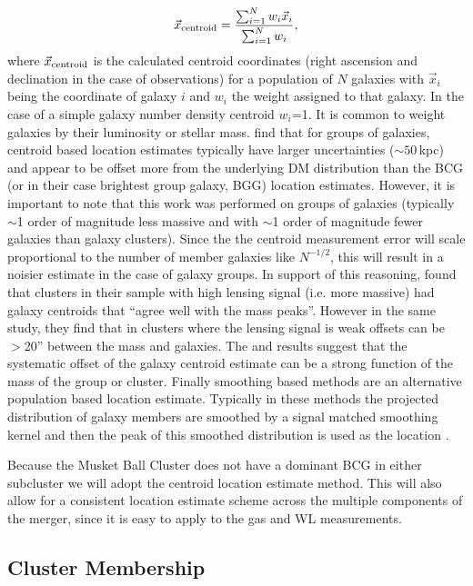 \begin{equation}
\vec{x}_{\rm centroid} = \frac{\sum_{i=1}^N w_i\vec{x}_i}{\sum_{i=1}^N w_i},
\label{equation:WeightedCentroid}
\end{equation}
where $\vec{x}_{\rm centroid}$ is the calculated centroid coordinates (right ascension and declination in the case of observations) for a population of $N$ galaxies with $\vec{x}_i$ being the coordinate of galaxy $i$ and $w_i$ the weight assigned to that galaxy.
In the case of a simple galaxy number density centroid $w_i$=1.
It is common to weight galaxies by their luminosity or stellar mass.
\citet{George:2012uo} find that for groups of galaxies, centroid based location estimates typically have larger uncertainties ($\sim50$\,kpc) and appear to be offset more from the underlying DM distribution than the BCG (or in their case brightest group galaxy, BGG) location estimates.
However, it is important to note that this work was performed on groups of galaxies (typically $\sim$1 order of magnitude less massive and with $\sim$1 order of magnitude fewer galaxies than galaxy clusters).
Since the the centroid measurement error will scale proportional to the number of member galaxies like $N^{-1/2}$, this will result in a noisier estimate in the case of galaxy groups.
In support of this reasoning, \citet{Jee:2011we} found that clusters in their sample with high lensing signal (i.e. more massive) had galaxy centroids that ``agree well with the mass peaks''.
However in the same study, they find that in clusters where the lensing signal is weak offsets can be $>$20'' between the mass and galaxies.
The \citet{George:2012uo} and \citet{Jee:2011we} results suggest that the systematic offset of the galaxy centroid estimate can be a strong function of the mass of the group or cluster.
Finally smoothing based methods are an alternative population based location estimate.
Typically in these methods the projected distribution of galaxy members are smoothed by a signal matched smoothing kernel and then the peak of this smoothed distribution is used as the location \citep[see e.g.][]{Merritt:1994fc, Gonzalez:2002kl, Randall:2008hs}.

Because the Musket Ball Cluster does not have a dominant BCG in either subcluster we will adopt the centroid location estimate method.
This will also allow for a consistent location estimate scheme across the multiple components of the merger, since it is easy to apply to the gas and WL measurements.


\subsection{Cluster Membership}\label{section:ClusterMembership}

